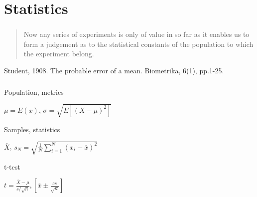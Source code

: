 \documentclass[usenames,dvipsnames, 18pt, compress, aspectratio=169]{beamer}
\begin{document}
\section{Statistics}

\begin{frame}
    \frametitle{}
    \begin{center}
        \blockquote{Now any series of experiments is only of value in so far as
            it enables us to form a judgement as to the statistical constants
            of the population to which the experiment belong.}

        \begin{flushright}
            \fontsize{10pt}{0}\selectfont
            Student, 1908. The probable error of a mean. Biometrika, 6(1), pp.1-25.
        \end{flushright}
    \end{center}
\end{frame}

\begin{frame}
    \frametitle{}
    \begin{flushleft}
        Population, metrics

        \begin{center}
        $\mu = E(x)$, $\sigma = \sqrt{E[(X - \mu) ^ 2]}$
        \end{center}

        Samples, statistics

        \begin{center}
        $\overline{X}$, $s_N = \sqrt{\frac{1}{N} \sum^N_{i=1}{(x_i - \overline{x})^2}}$
        \end{center}

        t-test

        \begin{center}
        $t = \frac{\overline{X} - \mu}{s / \sqrt{n}}, [ \overline{x} \pm \frac{cs}{\sqrt{n}} ]$
        \end{center}
    \end{flushleft}
\end{frame}
\end{document}
